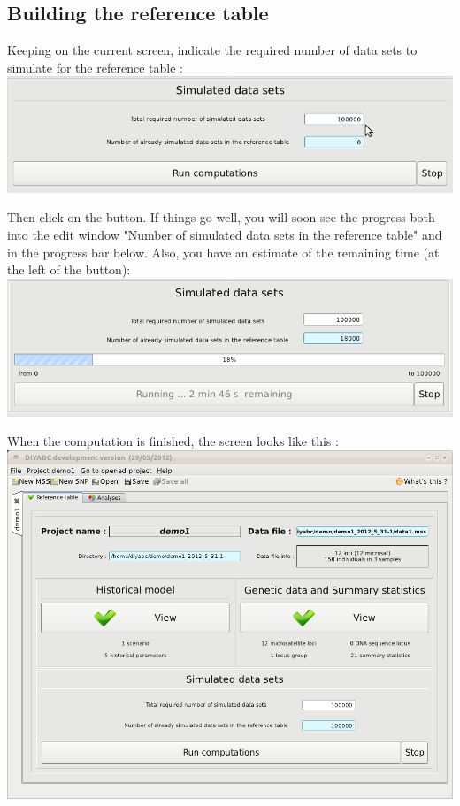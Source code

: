 \subsection{Building the reference table}

Keeping on the current screen, indicate the required number of data
sets to simulate for the reference table : \\


\includegraphics[scale=0.35]{gui_pictures/Capture-DIYABC-24}

Then click on the  button. If things
go well, you will soon see the progress both into the edit window
"Number of simulated data sets in the reference table"
and in the progress bar below. Also, you have an estimate of the remaining
time (at the left of the  button):\\


\includegraphics[scale=0.35]{gui_pictures/Capture-DIYABC-25}

When the computation is finished, the screen looks like this :\\


\includegraphics[scale=0.35]{gui_pictures/Capture-DIYABC-26}


